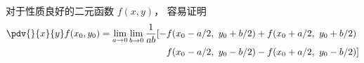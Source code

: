 

对于性质良好的二元函数 $f(x,y)$， 容易证明
\begin{equation}
\begin{aligned}
\pdv{}{x}{y} f(x_0,y_0) = \lim_{a\to 0}\lim_{b\to 0}\frac{1}{ab}[-& f(x_0-a/2,\ y_0+b/2) + f(x_0+a/2,\  y_0+b/2)\\
& f(x_0-a/2,\  y_0-b/2) - f(x_0+a/2,\  y_0-b/2)]
\end{aligned}
\end{equation}

